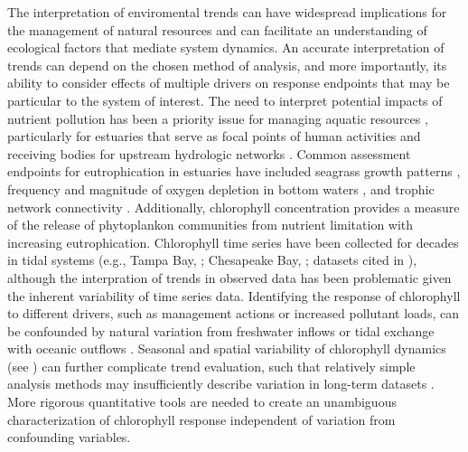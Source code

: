 \documentclass[letterpaper,12pt,oneside]{article}\usepackage[]{graphicx}\usepackage[]{color}
\begin{document}
The interpretation of enviromental trends can have widespread implications for the management of natural resources and can facilitate an understanding of ecological factors that mediate system dynamics.  An accurate interpretation of trends can depend on the chosen method of analysis, and more importantly, its ability to consider effects of multiple drivers on response endpoints that may be particular to the system of interest.  The need to interpret potential impacts of nutrient pollution has been a priority issue for managing aquatic resources \citep{Nixon95}, particularly for estuaries that serve as focal points of human activities and receiving bodies for upstream hydrologic networks \citep{Paerl14}.  Common assessment endpoints for eutrophication in estuaries have included seagrass growth patterns \citep{Steward07}, frequency and magnitude of oxygen depletion in bottom waters \citep{Paerl06}, and trophic network connectivity \citep{Powers05}.  Additionally, chlorophyll concentration provides a measure of the release of phytoplankon communities from nutrient limitation with increasing eutrophication.  Chlorophyll time series have been collected for decades in tidal systems (e.g., Tampa Bay, \citet{TBEP11}; Chesapeake Bay, \citet{Harding94}; datasets cited in \citet{Monbet92,Cloern10}), although the interpration of trends in observed data has been problematic given the inherent variability of time series data. Identifying the response of chlorophyll to different drivers, such as management actions or increased pollutant loads, can be confounded by natural variation from freshwater inflows \citep{Borsuk04b} or tidal exchange with oceanic outflows \citep{Monbet92}.  Seasonal and spatial variability of chlorophyll dynamics (see \citet{Cloern96}) can further complicate trend evaluation, such that relatively simple analysis methods may insufficiently describe variation in long-term datasets \citep{Hirsch14b}.  More rigorous quantitative tools are needed to create an unambiguous characterization of chlorophyll response independent of variation from confounding variables.
\end{document}
